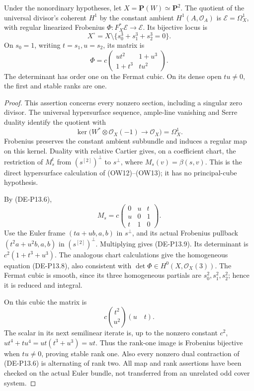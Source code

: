 \begin{lemma}
\label{lem:DE-primitive-one-three-Euler}
Under the nonordinary hypotheses, let \(X=\mathbf P(W)\simeq
\mathbf P^2\). The quotient of the universal divisor's coherent
\(H^1\) by the constant ambient \(H^1(A,\mathcal O_A)\) is
\(\mathcal E=\Omega_X^1\), with regular linearized Frobenius
\(\Phi:F_X^*\mathcal E\to\mathcal E\). Its bijective locus is
\[
             X^\circ=X\setminus\{s_0^3+s_1^3+s_2^3=0\}.
                                                               \tag{DE-P13.8}
\]
On \(s_0=1\), writing \(t=s_1,u=s_2\), its matrix is
\[
 \Phi=c\begin{pmatrix}ut^2&1+u^3\\1+t^3&tu^2\end{pmatrix}.
                                                               \tag{DE-P13.9}
\]
The determinant has order one on the Fermat cubic. On its dense
open \(tu\ne0\), the first and stable ranks are one.
\end{lemma}
\begin{proof}
This assertion concerns every nonzero section, including a singular
zero divisor. The universal hypersurface sequence, ample-line
vanishing and Serre duality identify the quotient with
\[
 \ker\bigl(W^*\otimes\mathcal O_X(-1)\longrightarrow\mathcal O_X\bigr)
       =\Omega_X^1.                                   \tag{DE-P13.10}
\]
Frobenius preserves the constant ambient subbundle and induces a
regular map on this kernel. Duality with relative Cartier gives,
on a coefficient chart, the restriction of \(M_s^t\) from
\((s^{[2]})^\perp\) to \(s^\perp\), where
\(M_s(v)=\beta(s,v)\). This is the direct hypersurface calculation
of (OW12)--(OW13); it has no principal-cube hypothesis.

By (DE-P13.6),
\[
 M_s=c\begin{pmatrix}0&u&t\\u&0&1\\t&1&0\end{pmatrix}.
\]
Use the Euler frame \((ta+ub,a,b)\) in \(s^\perp\), and its
actual Frobenius pullback \((t^2a+u^2b,a,b)\) in
\((s^{[2]})^\perp\). Multiplying gives (DE-P13.9).
Its determinant is \(c^2(1+t^3+u^3)\). The analogous chart
calculations give the homogeneous equation (DE-P13.8), also
consistent with \(\det\Phi\in H^0(X,\mathcal O_X(3))\).
The Fermat cubic is smooth, since its three homogeneous partials
are \(s_0^2,s_1^2,s_2^2\); hence it is reduced and integral.

On this cubic the matrix is
\[
        c\binom{t^2}{u^2}(u\quad t).                 \tag{DE-P13.11}
\]
The scalar in its next semilinear iterate is, up to the nonzero
constant \(c^2\),
\(ut^4+tu^4=ut(t^3+u^3)=ut\). Thus the rank-one image is
Frobenius bijective when \(tu\ne0\), proving stable rank one.
Also every nonzero dual contraction of (DE-P13.6) is alternating
of rank two. All map and rank assertions have been checked on
the actual Euler bundle, not transferred from an unrelated odd
cover system.
\end{proof}

